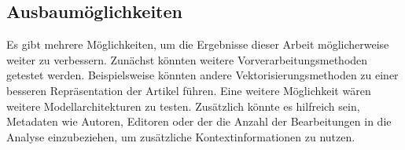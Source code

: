 \subsection{Ausbaumöglichkeiten}
Es gibt mehrere Möglichkeiten, um die Ergebnisse dieser Arbeit möglicherweise weiter zu verbessern. Zunächst könnten weitere Vorverarbeitungsmethoden getestet werden. Beispielsweise könnten andere Vektorisierungsmethoden zu einer besseren Repräsentation der Artikel führen. Eine weitere Möglichkeit wären weitere Modellarchitekturen zu testen. Zusätzlich könnte es hilfreich sein, Metadaten wie Autoren, Editoren oder der die Anzahl der Bearbeitungen in die Analyse einzubeziehen, um zusätzliche Kontextinformationen zu nutzen.
